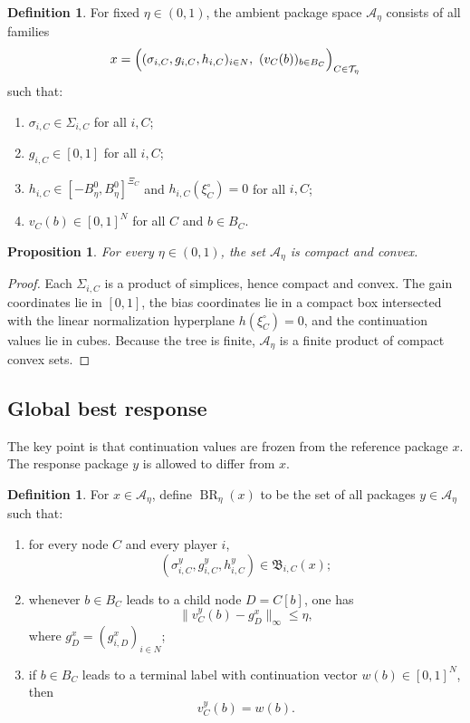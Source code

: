 \documentclass[12pt]{article}
\newtheorem{proposition}[theorem]{Proposition}
\theoremstyle{definition}
\newtheorem{definition}[theorem]{Definition}
\newcommand{\1}{\mathbf{1}}
\newcommand{\cA}{\mathcal{A}}
\newcommand{\cT}{\mathcal{T}}
\DeclareMathOperator{\BR}{BR}
\begin{document}
\begin{definition}
\label{def:Aeta}
For fixed $\eta\in(0,1)$, the ambient package space $\cA_\eta$ consists of all
families
\[
x=\Bigl((\sigma_{i,C},g_{i,C},h_{i,C})_{i\in N},\ (v_C(b))_{b\in B_C}\Bigr)_{C\in\cT_\eta}
\]
such that:
\begin{enumerate}[label=\textnormal{(A\arabic*)},leftmargin=2.8em]
\item $\sigma_{i,C}\in \Sigma_{i,C}$ for all $i,C$;
\item $g_{i,C}\in[0,1]$ for all $i,C$;
\item $h_{i,C}\in[-B_\eta^0,B_\eta^0]^{\Xi_C}$ and
$h_{i,C}(\xi_C^\circ)=0$ for all $i,C$;
\item $v_C(b)\in[0,1]^N$ for all $C$ and $b\in B_C$.
\end{enumerate}
\end{definition}

\begin{proposition}
\label{prop:Aeta-compact}
For every $\eta\in(0,1)$, the set $\cA_\eta$ is compact and convex.
\end{proposition}

\begin{proof}
Each $\Sigma_{i,C}$ is a product of simplices, hence compact and convex. The gain
coordinates lie in $[0,1]$, the bias coordinates lie in a compact box intersected
with the linear normalization hyperplane $h(\xi_C^\circ)=0$, and the continuation
values lie in cubes. Because the tree is finite, $\cA_\eta$ is a finite product of
compact convex sets.
\end{proof}

\subsection{Global best response}

The key point is that continuation values are frozen from the reference package
$x$. The response package $y$ is allowed to differ from $x$.

\begin{definition}
\label{def:global-BR}
For $x\in\cA_\eta$, define $\BR_\eta(x)$ to be the set of all packages
$y\in\cA_\eta$ such that:
\begin{enumerate}[label=\textnormal{(G\arabic*)},leftmargin=2.8em]
\item for every node $C$ and every player $i$,
\[
(\sigma_{i,C}^y,g_{i,C}^y,h_{i,C}^y)\in \mathfrak B_{i,C}(x);
\]
\item whenever $b\in B_C$ leads to a child node $D=C[b]$, one has
\begin{equation}
\label{eq:frozen-continuation}
\|v_C^y(b)-g_D^x\|_\infty\le \eta,
\end{equation}
where $g_D^x=(g_{i,D}^x)_{i\in N}$;
\item if $b\in B_C$ leads to a terminal label with continuation vector
$w(b)\in[0,1]^N$, then
\[
v_C^y(b)=w(b).
\]
\end{enumerate}
\end{definition}
\end{document}
